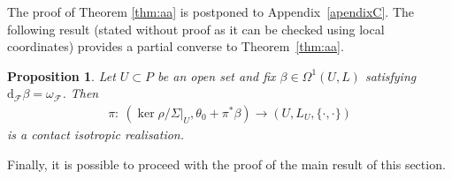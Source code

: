 \documentclass[10pt,a4paper]{amsart}
\numberwithin{equation}{section}
\newtheorem{Proposition}[Theorem]{Proposition}
\newcommand{\de}{\mathrm{d}} %
\begin{document}
The proof of Theorem \ref{thm:aa} is postponed to Appendix~\ref{apendixC}. The following result (stated without proof as it can be checked using local coordinates) provides a partial converse to Theorem~\ref{thm:aa}.

\begin{Proposition}\label{prop:local_cir}
Let $U \subset P$ be an open set and fix $\beta\in\Omega^1(U,L)$ satisfying $\de_{\mathcal{F}}\beta=\omega_{\mathcal{F}}$. Then
\begin{gather*}
 \pi\colon \ (\ker\rho/\Sigma|_U,\theta_0+\pi^*\beta)\to (U,L_U,\{\cdot,\cdot\})
\end{gather*}
is a contact isotropic realisation.
\end{Proposition}

Finally, it is possible to proceed with the proof of the main result of this section.
\end{document}
